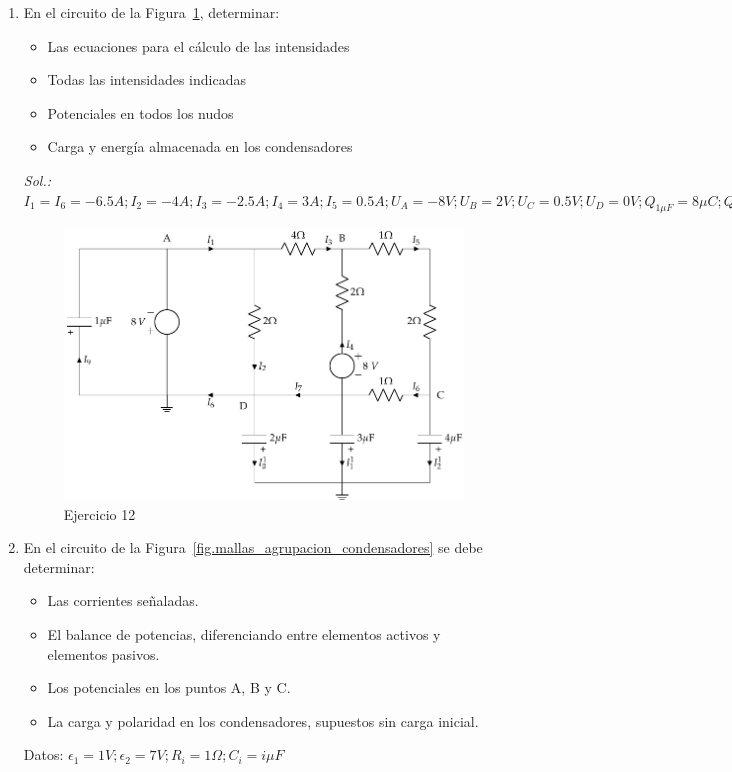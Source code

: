 \documentclass[11pt]{book} %
\begin{document}
\begin{enumerate}
\item En el circuito de la Figura~\ref{fig.ej11_BT1}, determinar:
\begin{itemize}
    \item Las ecuaciones para el cálculo de las intensidades
    \item Todas las intensidades indicadas
    \item Potenciales en todos los nudos
    \item Carga y energía almacenada en los condensadores
\end{itemize}
\emph{Sol.: $I_1=I_6=-6.5A; I_2=-4A; I_3=-2.5A; I_4=3A; I_5=0.5A; U_A=-8V; U_B=2V; U_C=0.5V; U_D=0V;Q_{1\mu F}=8\mu C; Q_{2\mu F}=Q_{3\mu F}=0\mu C; Q_{4\mu F}=-2\mu C; E_{1\mu F}=32\mu F; E_{2\mu F}=E_{3\mu F}=0 J; E_{4\mu F}=0.5\mu C$}
\begin{figure}[htbp]
    \centering
    \includegraphics{../figs/ej11_BT1.pdf}
    \caption{Ejercicio 12}
    \label{fig.ej11_BT1}
\end{figure}

\item En el circuito de la Figura~\ref{fig.mallas_agrupacion_condensadores} se debe determinar:
\begin{itemize}
\item Las corrientes señaladas.
\item El balance de potencias, diferenciando entre elementos activos y elementos pasivos.
\item Los potenciales en los puntos A, B y C.
\item La carga y polaridad en los condensadores, supuestos sin carga inicial.
\end{itemize}
Datos: $\epsilon_1 ={1}V; \epsilon_2 ={7}V; R_i  = {1}\Omega; C_i = {i}{\mu F}$


\end{enumerate}
\end{document}
